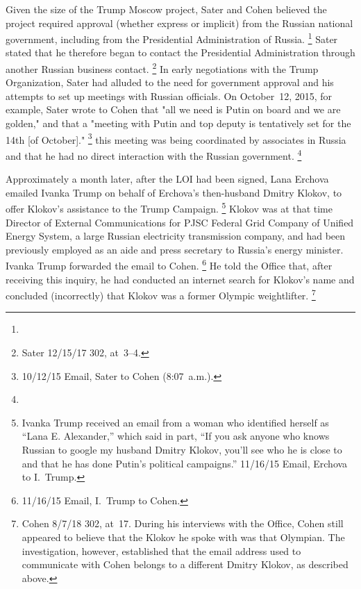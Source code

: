 Given the size of the Trump Moscow project, Sater and Cohen believed the project required approval (whether express or implicit) from the Russian national government, including from the Presidential Administration of Russia.%
\footnote{}
Sater stated that he therefore began to contact the Presidential Administration through another Russian business contact.%
\footnote{Sater 12/15/17 302, at~3--4.}
In early negotiations with the Trump Organization, Sater had alluded to the need for government approval and his attempts to set up meetings with Russian officials.
On October~12, 2015, for example, Sater wrote to Cohen that "all we need is Putin on board and we are golden," and that a "meeting with Putin and top deputy is tentatively set for the 14th [of October]."%
\footnote{10/12/15 Email, Sater to Cohen (8:07~a.m.).}
 this meeting was being coordinated by associates in Russia and that he had no direct interaction with the Russian government.%
\footnote{}

Approximately a month later, after the LOI had been signed, Lana Erchova emailed Ivanka Trump on behalf of Erchova's then-husband Dmitry Klokov, to offer Klokov's assistance to the Trump Campaign.%
\footnote{Ivanka Trump received an email from a woman who identified herself as ``Lana E. Alexander,'' which said in part, ``If you ask anyone who knows Russian to google my husband Dmitry Klokov, you'll see who he is close to and that he has done Putin's political campaigns.''
11/16/15 Email, Erchova to I.~Trump.}
Klokov was at that time Director of External Communications for PJSC Federal Grid Company of Unified Energy System, a large Russian electricity transmission company, and had been previously employed as an aide and press secretary to Russia's energy minister.
Ivanka Trump forwarded the email to Cohen.%
\footnote{11/16/15 Email, I.~Trump to Cohen.}
He told the Office that, after receiving this inquiry, he had conducted an internet search for Klokov's name and concluded (incorrectly) that Klokov was a former Olympic weightlifter.%
\footnote{Cohen 8/7/18 302, at~17.
During his interviews with the Office, Cohen still appeared to believe that the Klokov he spoke with was that Olympian.
The investigation, however, established that the email address used to communicate with Cohen belongs to a different Dmitry Klokov, as described above.}

